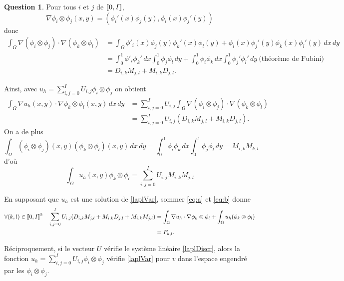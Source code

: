 \documentclass[11pt]{article}
\DeclarePairedDelimiter{\zintcc}{[\![}{]\!]}
\theoremstyle{definition}
\newtheorem{ques}{Question}
\begin{document}
\begin{ques}
Pour tous $i$ et $j$ de $\zintcc{0,I}$,
\[
\nabla \phi_i\otimes\phi_j (x,y) = \left(
\phi_i'(x)\phi_j(y), \phi_i(x)\phi_j'(y)
\right)
\]
donc 
\begin{align*}
\int_{\Omega}\nabla(\phi_i\otimes\phi_j)\cdot\nabla(\phi_k\otimes\phi_l) 
&=
\int_{\Omega} \phi'_i(x)\phi_j(y)\phi_k'(x)\phi_l(y) + \phi_i(x)\phi_j'(y)\phi_k(x)\phi_l'(y)\,dx\,dy \\
&= \int_{0}^{1}\phi'_i\phi_k'\,dx\int_0^1\phi_j\phi_l\,dy + \int_{0}^{1}\phi_i\phi_k\,dx\int_0^1\phi_j'\phi_l'\,dy\ \text{(théorème de Fubini)} \\
&= D_{i,k}M_{j,l} + M_{i,k}D_{j,l}.
\end{align*}

Ainsi, avec $u_h = \sum_{i,j=0}^{I}U_{i,j}\phi_i\otimes\phi_j$ on obtient
\begin{align*}\tag{a}\label{eq:a}
\int_{\Omega} \nabla u_h(x,y)\cdot \nabla \phi_k\otimes\phi_l (x,y)\,dx\,dy 
&= \sum_{i,j=0}^{I}U_{i,j} \int_\Omega\nabla(\phi_i\otimes\phi_j)\cdot\nabla(\phi_k\otimes\phi_l) \\
&= \sum_{i,j=0}^{I}U_{i,j} (D_{i,k}M_{j,l}+M_{i,k}D_{j,l}).
\end{align*}
On a de plus
\[
\int_\Omega (\phi_i\otimes\phi_j)(x,y)(\phi_k\otimes\phi_l)(x,y)\,dx\,dy = \int_0^1 \phi_i \phi_k\,dx \int_0^1 \phi_j \phi_l\,dy = M_{i,k}M_{k,l}
\]
d'où
\begin{equation}\tag{b}\label{eq:b}
\int_\Omega u_h(x,y)\phi_k\otimes\phi_l = \sum_{i,j=0}^{I}U_{i,j}M_{i,k}M_{j,l}
\end{equation}

En supposant que $u_h$ est une solution de \eqref{laplVar}, sommer \eqref{eq:a} et \eqref{eq:b} donne
\begin{align}\label{laplDiscr}
\forall (k,l)\in \zintcc{0,I}^2\quad
\sum_{i,j=0}^{I}U_{i,j}(D_{i,k}M_{j,l} + M_{i,k}D_{j,l} + M_{i,k}M_{j,l}) &=
\int_\Omega\nabla u_h\cdot \nabla\phi_k\otimes\phi_l + \int_\Omega u_h (\phi_k\otimes\phi_l) \nonumber \\
&= F_{k,l}.
\end{align}


Réciproquement, si le vecteur $U$ vérifie le système linéaire \eqref{laplDiscr}, alors la fonction $u_h = \sum_{i,j=0}^{I}U_{i,j}\phi_i\otimes\phi_j$ vérifie \eqref{laplVar} pour $v$ dans l'espace engendré par les $\phi_i\otimes\phi_j$.


\end{ques}
\end{document}
